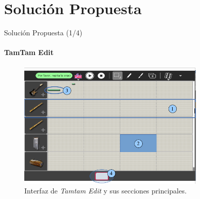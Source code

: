 \section{Soluci\'on Propuesta}

\begin{frame}{Soluci\'on Propuesta (1/4)}
\framesubtitle{TamTam Edit}

\begin{figure}[H]
\centering
\includegraphics[width=0.8\textwidth]{./graphics/ui-tamtam-edit.png}
\caption{Interfaz de \emph{Tamtam Edit} y sus secciones principales.}
\label{figure:ui-tamtam}
\end{figure}

\end{frame}

